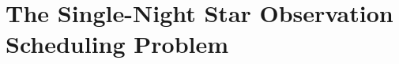\documentclass{beamer}
\begin{document}
\begin{frame}
\begin{minipage}[t]{0.48\linewidth}
    \pause
  \end{minipage}
\end{frame}

\section{The Single-Night Star Observation Scheduling Problem}

\def\mystar#1#2#3#4#5#6#7{
  \begin{scope}[shift={(#2,#1)},opacity=#7,transparency group]
    \draw[line width=1pt,color=blue,arrows={Bracket-Bracket}] (0.4,0) -- +(#3,0);
    \draw[line width=5pt,color=red] (0.4,0) ++(#4,0) -- ++(#5,0);
    \def\tmp{#6}\if\tmp\empty\else
    \node[star, star point height=3mm, minimum size=5mm, color=yellow, fill=yellow, text=black,scale=.4] at (0,0) {#6};
    \fi
  \end{scope}
}

\def\mystaronly#1#2#3#4{
  \begin{scope}[shift={(#2,#1)},opacity=#4,transparency group]
    \node[star, star point height=3mm, minimum size=5mm, color=yellow, fill=yellow, text=black,scale=.4] at (0,0) {#3};
  \end{scope}
}
\end{document}

